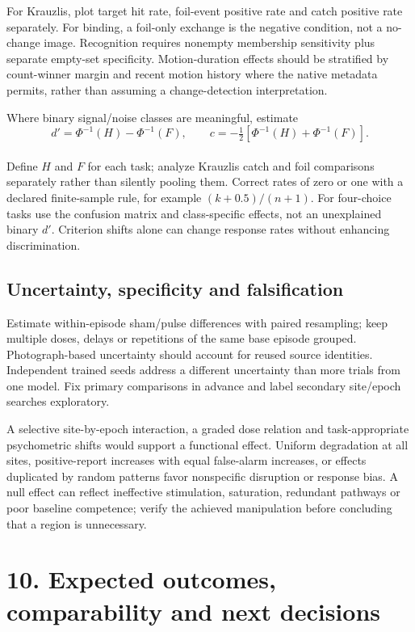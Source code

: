 \documentclass[
  10pt,
]{article}
\newcounter{none} %
\begin{document}
For Krauzlis, plot target hit rate, foil-event positive rate and catch
positive rate separately. For binding, a foil-only exchange is the
negative condition, not a no-change image. Recognition requires nonempty
membership sensitivity plus separate empty-set specificity.
Motion-duration effects should be stratified by count-winner margin and
recent motion history where the native metadata permits, rather than
assuming a change-detection interpretation.

Where binary signal/noise classes are meaningful, estimate\\
\[
 d'=\Phi^{-1}(H)-\Phi^{-1}(F),\qquad
 c=-\tfrac12[\Phi^{-1}(H)+\Phi^{-1}(F)].
\]\\
Define \(H\) and \(F\) for each task; analyze Krauzlis catch and foil
comparisons separately rather than silently pooling them. Correct rates
of zero or one with a declared finite-sample rule, for example
\((k+0.5)/(n+1)\). For four-choice tasks use the confusion matrix and
class-specific effects, not an unexplained binary \(d'\). Criterion
shifts alone can change response rates without enhancing discrimination.

\subsection{Uncertainty, specificity and
falsification}\label{uncertainty-specificity-and-falsification}

Estimate within-episode sham/pulse differences with paired resampling;
keep multiple doses, delays or repetitions of the same base episode
grouped. Photograph-based uncertainty should account for reused source
identities. Independent trained seeds address a different uncertainty
than more trials from one model. Fix primary comparisons in advance and
label secondary site/epoch searches exploratory.

A selective site-by-epoch interaction, a graded dose relation and
task-appropriate psychometric shifts would support a functional effect.
Uniform degradation at all sites, positive-report increases with equal
false-alarm increases, or effects duplicated by random patterns favor
nonspecific disruption or response bias. A null effect can reflect
ineffective stimulation, saturation, redundant pathways or poor baseline
competence; verify the achieved manipulation before concluding that a
region is unnecessary.

\newpage

\section{10. Expected outcomes, comparability and next
decisions}\label{expected-outcomes-comparability-and-next-decisions}
\end{document}
